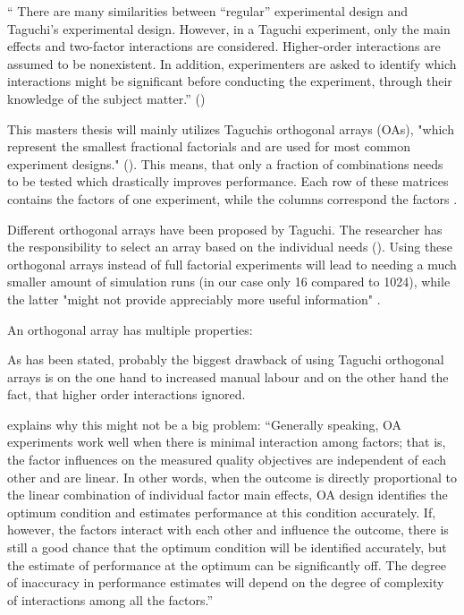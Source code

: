 \enquote{ There are many similarities between “regular” experimental design and Taguchi's experimental design. However, in a Taguchi experiment, only the main effects and two-factor interactions are considered. Higher-order interactions are assumed to be nonexistent. In addition, experimenters are asked to identify which interactions might be significant before conducting the experiment, through their knowledge of the subject matter.} (\cite{yang_design_2009})

This masters thesis will mainly utilizes Taguchis orthogonal arrays (OAs), "which represent the smallest fractional factorials and are used for most common experiment designs." (\cite{roy_primer_1990}). This means, that only a fraction of combinations needs to be tested which drastically improves performance. Each row of these matrices contains the factors of one experiment, while the columns correspond the factors \cite{li_taguchi_2021}. 

Different orthogonal arrays have been proposed by Taguchi. The researcher has the responsibility to select an array based on the individual needs (\cite{li_taguchi_2021}).
Using these orthogonal arrays instead of full factorial experiments will lead to needing a much smaller amount of simulation runs (in our case only 16 compared to 1024), while the latter "might not provide appreciably more useful information" \cite{roy_primer_1990}.


An orthogonal array has multiple properties:



As has been stated, probably the biggest drawback of using Taguchi orthogonal arrays is on the one hand to increased manual labour and on the other hand the fact, that higher order interactions ignored.

\cite{roy_primer_1990} explains why this might not be a big problem:
\enquote{Generally speaking, OA experiments work well when there is minimal interaction among factors; that is, the factor influences on the measured quality objectives are independent of each other and are linear. In other words, when the outcome is directly proportional to the linear combination of individual factor main effects, OA design identifies the optimum condition and estimates performance at this condition accurately. If, however, the factors interact with each other and influence the outcome, there is still a good chance that the optimum condition will be identified accurately, but the estimate of performance at the optimum can be significantly off. The degree of inaccuracy in performance estimates will depend on the degree of complexity of interactions among all the factors.}

